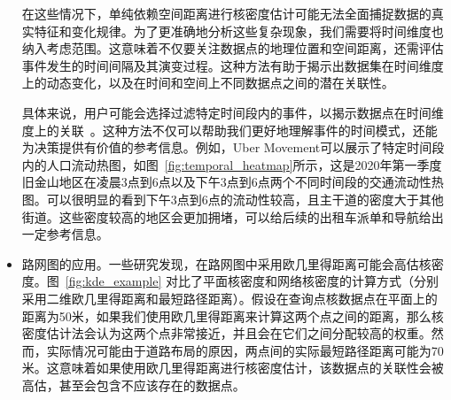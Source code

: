 \begin{itemize}[leftmargin=*]
	在这些情况下，单纯依赖空间距离进行核密度估计可能无法全面捕捉数据的真实特征和变化规律。为了更准确地分析这些复杂现象，我们需要将时间维度也纳入考虑范围。这意味着不仅要关注数据点的地理位置和空间距离，还需评估事件发生的时间间隔及其演变过程。这种方法有助于揭示出数据集在时间维度上的动态变化，以及在时间和空间上不同数据点之间的潜在关联性。

	具体来说，用户可能会选择过滤特定时间段内的事件，以揭示数据点在时间维度上的关联~\cite{brunsdon_visualising_2007}。这种方法不仅可以帮助我们更好地理解事件的时间模式，还能为决策提供有价值的参考信息。例如，Uber Movement可以展示了特定时间段内的人口流动热图，如图~\ref{fig:temporal_heatmap}所示，这是2020年第一季度旧金山地区在凌晨3点到6点以及下午3点到6点两个不同时间段的交通流动性热图。可以很明显的看到下午3点到6点的流动性较高，且主干道的密度大于其他街道。这些密度较高的地区会更加拥堵，可以给后续的出租车派单和导航给出一定参考信息。
	
	\item 路网图的应用。一些研究发现，在路网图中采用欧几里得距离可能会高估核密度。图~\ref{fig:kde_example} 对比了平面核密度和网络核密度的计算方式（分别采用二维欧几里得距离和最短路径距离）。假设在查询点核数据点在平面上的距离为50米，如果我们使用欧几里得距离来计算这两个点之间的距离，那么核密度估计法会认为这两个点非常接近，并且会在它们之间分配较高的权重。然而，实际情况可能由于道路布局的原因，两点间的实际最短路径距离可能为70米。这意味着如果使用欧几里得距离进行核密度估计，该数据点的关联性会被高估，甚至会包含不应该存在的数据点。
	

\end{itemize}
